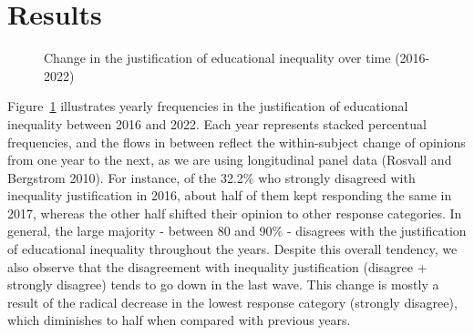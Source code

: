 \documentclass[
]{article}
\begin{document}
\section{Results}\label{results}

\begin{figure}[H]


\caption{\label{fig-alluvial}Change in the justification of educational
inequality over time (2016-2022)}

\end{figure}%

Figure~\ref{fig-alluvial} illustrates yearly frequencies in the
justification of educational inequality between 2016 and 2022. Each year
represents stacked percentual frequencies, and the flows in between
reflect the within-subject change of opinions from one year to the next,
as we are using longitudinal panel data (Rosvall and Bergstrom 2010).
For instance, of the 32.2\% who strongly disagreed with inequality
justification in 2016, about half of them kept responding the same in
2017, whereas the other half shifted their opinion to other response
categories. In general, the large majority - between 80 and 90\% -
disagrees with the justification of educational inequality throughout
the years. Despite this overall tendency, we also observe that the
disagreement with inequality justification (disagree + strongly
disagree) tends to go down in the last wave. This change is mostly a
result of the radical decrease in the lowest response category (strongly
disagree), which diminishes to half when compared with previous years.
\end{document}
